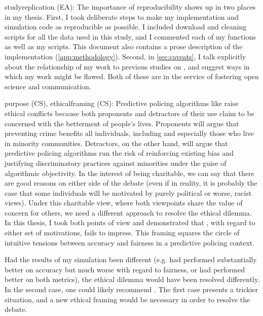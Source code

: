 \begin{itemize}

\hashtag studyreplication (EA): The importance of reproducibility shows up in two places in my thesis. First, I took deliberate steps to make my implementation and simulation code as reproducible as possible. I included download and cleaning scripts for all the data used in this study, and I commented each of my functions as well as my scripts. This document also contains a prose description of the implementation (\autoref{app:methodology}). Second, in \autoref{sec:caveats}, I talk explicitly about the relationship of my work to previous studies on \pp, and suggest ways in which my work might be flawed. Both of these are in the service of fostering open science and communication.

\hashtag purpose (CS), ethicalframing (CS): Predictive policing algorithms like \pp raise ethical conflicts because both proponents and detractors of their use claim to be concerned with the betterment of people's lives. Proponents will argue that preventing crime benefits all individuals, including and especially those who live in minority communities. Detractors, on the other hand, will argue that predictive policing algorithms run the risk of reinforcing existing bias and justifying discriminatory practices against minorities under the guise of algorithmic objectivity. In the interest of being charitable, we can say that there are good reasons on either side of the debate (even if in reality, it is probably the case that some individuals will be motivated by purely political or worse, racist views). Under this charitable view, where both viewpoints share the value of concern for others, we need a different approach to resolve the ethical dilemma. In this thesis, I took both points of view and demonstrated that \pp, with regard to either set of motivations, fails to impress. This framing squares the circle of intuitive tensions between accuracy and fairness in a predictive policing context.

Had the results of my simulation been different (e.g. had \pp performed substantially better on accuracy but much worse with regard to fairness, or had \pp performed better on both metrics), the ethical dilemma would have been resolved differently. In the second case, one could likely recommend \pp. The first case presents a trickier situation, and a new ethical framing would be necessary in order to resolve the debate.


\end{itemize}
